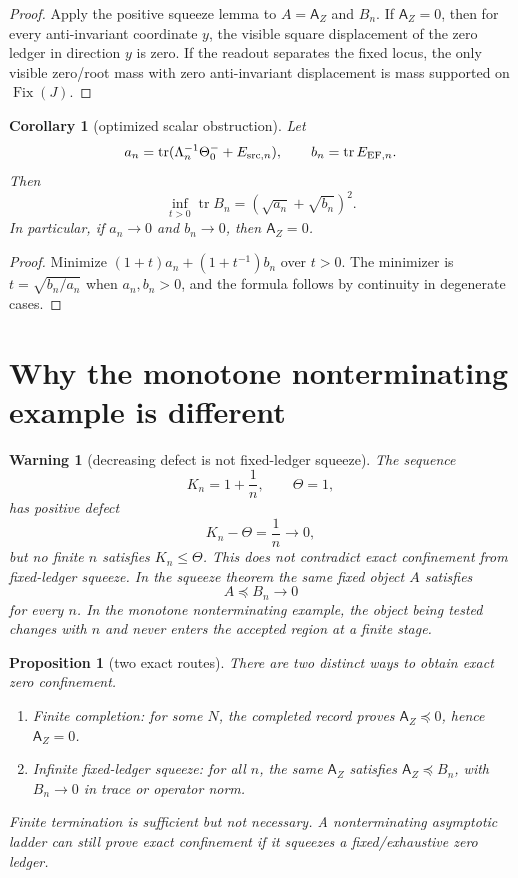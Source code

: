 \documentclass[11pt]{article}
\newtheorem{proposition}{Proposition}
\newtheorem{corollary}{Corollary}
\newtheorem{warning}{Warning}
\newcommand{\AZ}{\mathsf A_Z}
\newcommand{\Fix}{\operatorname{Fix}}
\newcommand{\tr}{\operatorname{tr}}
\begin{document}
\begin{proof}
Apply the positive squeeze lemma to $A=\AZ$ and $B_n$.
If $\AZ=0$, then for every anti-invariant coordinate $y$, the visible square displacement of the zero ledger in direction $y$ is zero. If the readout separates the fixed locus, the only visible zero/root mass with zero anti-invariant displacement is mass supported on $\Fix(J)$.
\end{proof}

\begin{corollary}[optimized scalar obstruction]
Let
\[
  a_n=\tr(\Lambda_n^{-1}\Theta_0^-+E_{{\rm src},n}),
  \qquad
  b_n=\tr E_{{\rm EF},n}.
\]
Then
\[
  \inf_{t>0}\tr B_n=(\sqrt{a_n}+\sqrt{b_n})^2.
\]
In particular, if $a_n\to0$ and $b_n\to0$, then $\AZ=0$.
\end{corollary}

\begin{proof}
Minimize $(1+t)a_n+(1+t^{-1})b_n$ over $t>0$. The minimizer is $t=\sqrt{b_n/a_n}$ when $a_n,b_n>0$, and the formula follows by continuity in degenerate cases.
\end{proof}

\section{Why the monotone nonterminating example is different}

\begin{warning}[decreasing defect is not fixed-ledger squeeze]
The sequence
\[
  K_n=1+\frac1n,
  \qquad
  \Theta=1,
\]
has positive defect
\[
  K_n-\Theta=\frac1n\to0,
\]
but no finite $n$ satisfies $K_n\le\Theta$. This does not contradict exact confinement from fixed-ledger squeeze. In the squeeze theorem the same fixed object $A$ satisfies
\[
  A\preceq B_n\to0
\]
for every $n$. In the monotone nonterminating example, the object being tested changes with $n$ and never enters the accepted region at a finite stage.
\end{warning}

\begin{proposition}[two exact routes]
There are two distinct ways to obtain exact zero confinement.
\begin{enumerate}[label=(\alph*)]
\item Finite completion: for some $N$, the completed record proves $\AZ\preceq0$, hence $\AZ=0$.
\item Infinite fixed-ledger squeeze: for all $n$, the same $\AZ$ satisfies $\AZ\preceq B_n$, with $B_n\to0$ in trace or operator norm.
\end{enumerate}
Finite termination is sufficient but not necessary. A nonterminating asymptotic ladder can still prove exact confinement if it squeezes a fixed/exhaustive zero ledger.
\end{proposition}
\end{document}
